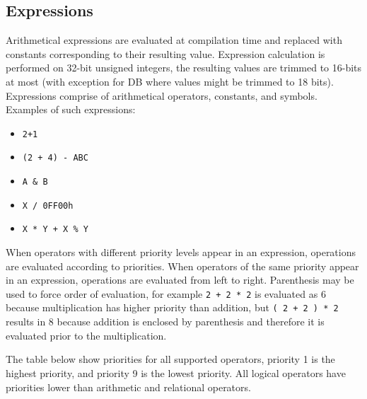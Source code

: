     \subsection{Expressions}
        Arithmetical expressions are evaluated at compilation time and replaced with constants corresponding to their resulting value. Expression calculation is performed on 32-bit unsigned integers, the resulting values are trimmed to 16-bits at most (with exception for DB where values might be trimmed to 18 bits). Expressions comprise of arithmetical operators, constants, and symbols. Examples of such expressions:

        \begin{itemize}
            \item \texttt{2+1}
            \item \texttt{(2 + 4) - ABC}
            \item \texttt{A \& B}
            \item \texttt{X / 0FF00h}
            \item \texttt{X * Y + X \% Y}
        \end{itemize}

        When operators with different priority levels appear in an expression, operations are evaluated according to priorities. When operators of the same priority appear in an expression, operations are evaluated from left to right. Parenthesis may be used to force order of evaluation, for example \texttt{2 + 2 * 2} is evaluated as 6 because multiplication has higher priority than addition, but \texttt{( 2 + 2 ) * 2} results in 8 because addition is enclosed by parenthesis and therefore it is evaluated prior to the multiplication.

        The table below show priorities for all supported operators, priority 1 is the highest priority, and priority 9 is the lowest priority. All logical operators have priorities lower than arithmetic and relational operators.


